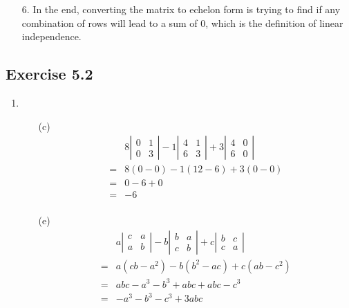 \documentclass{./../../Latex/homework}
\begin{document}
\begin{enumerate}
\item[6.] In the end, converting the matrix to echelon form is trying to find if any combination of rows will lead to a sum of 0, which is the definition of linear independence. 
\end{enumerate}


\subsection*{Exercise 5.2}

\begin{enumerate}
\item 
\begin{enumerate}
\item[(c)] $$
\begin{aligned}
& 8\left|\begin{array}{ll}
0 & 1 \\
0 & 3
\end{array}\right|-1\left|\begin{array}{ll}
4 & 1 \\
6 & 3
\end{array}\right|+3\left|\begin{array}{ll}
4 & 0 \\
6 & 0
\end{array}\right| \\
=& 8(0-0)-1(12-6)+3(0-0) \\
=& 0-6+0 \\
= &-6 \\
\end{aligned}
$$

\item[(e)] $$
\begin{aligned}
& a\left|\begin{array}{ll}
c & a \\
a & b
\end{array}\right|-b\left|\begin{array}{cc}
b & a \\
c & b
\end{array}\right|+c\left|\begin{array}{cc}
b & c \\
c & a
\end{array}\right| \\
=& a\left(c b-a^{2}\right)-b\left(b^{2}-a c\right)+c\left(a b-c^{2}\right) \\
=& a b c-a^{3}-b^{3}+a b c+a b c-c^{3} \\
=&-a^{3}-b^{3}-c^{3}+3 a b c
\end{aligned}
$$


\end{enumerate}
\end{enumerate}
\end{document}
